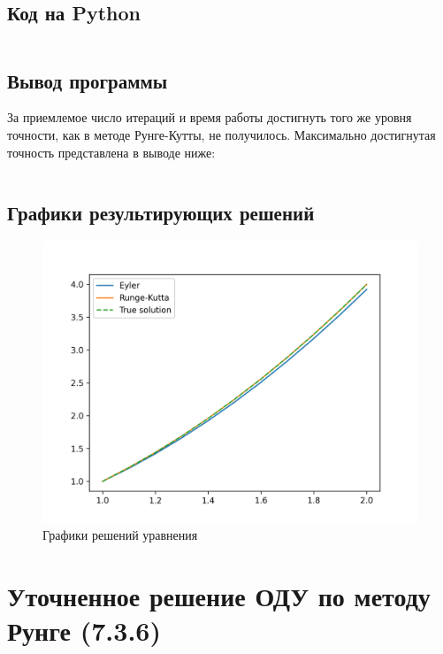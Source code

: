 \documentclass[a4paper,12pt]{article}
\newenvironment{longlisting}{\captionsetup{type=listing}}{}
\begin{document}
\subsection{Код на Python}

\begin{longlisting}
\inputminted{python}{src/eyler_vs_rk.py}
\end{longlisting}

\subsection{Вывод программы}
За приемлемое число итераций и время работы достигнуть того же уровня точности, как в методе Рунге-Кутты, не получилось.
Максимально достигнутая точность представлена в выводе ниже:
\begin{longlisting}
\inputminted{python}{output/eyler_vs_rk.txt}
\end{longlisting}

\subsection{Графики результирующих решений}
\begin{figure}[H]
	\centering
	\includegraphics[width=\linewidth]{plots/eyler_vs_rk.png}
	\caption{Графики решений уравнения}
	\label{fig:eyler_rk}
\end{figure}

\section{Уточненное решение ОДУ по методу Рунге (7.3.6)}
\end{document}
